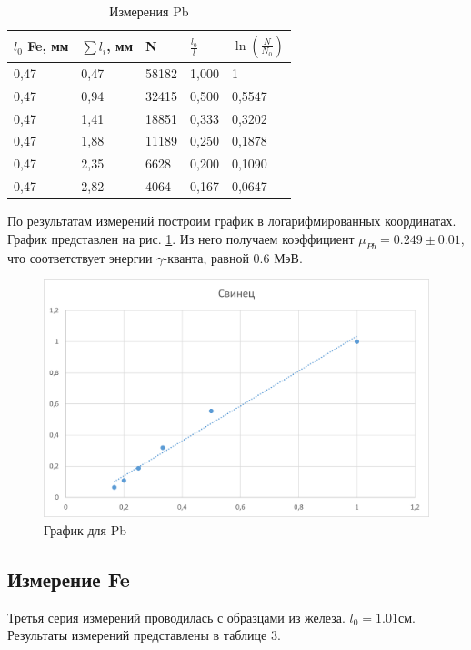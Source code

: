 \begin{table}[!ht]
    \centering
    \label{table:Pb}
    \caption{Измерения Pb}
    \begin{tabular}{|l|l|l|l|l|}
    \hline
        $l_0$ Fe, мм & $\sum l_i$, мм & N & $\frac {l_0}{l}$ & $\ln( \frac {N} {N_0} )$  \\ \hline
        0,47 & 0,47 & 58182 & 1,000 & 1  \\ \hline
        0,47 & 0,94 & 32415 & 0,500 & 0,5547  \\ \hline
        0,47 & 1,41 & 18851 & 0,333 & 0,3202  \\ \hline
        0,47 & 1,88 & 11189 & 0,250 & 0,1878  \\ \hline
        0,47 & 2,35 & 6628 & 0,200 & 0,1090  \\ \hline
        0,47 & 2,82 & 4064 & 0,167 & 0,0647  \\ \hline
    \end{tabular}
\end{table}

По результатам измерений построим график в логарифмированных координатах. График представлен на рис. \ref{fig:Pb_plot}. Из него получаем коэффициент $\mu_{Pb} = 0.249 \pm 0.01$, что соответствует энергии $\gamma$-кванта, равной 0.6 МэВ.

\begin{figure}[h]
    \centering
    \includegraphics[width=1\textwidth]{Pb_plot.png}
    \caption{График для Pb}
    \label{fig:Pb_plot}
\end{figure}

\subsection{Измерение Fe}
Третья серия измерений проводилась с образцами из железа. $l_0 = 1.01\text{см}$. Результаты измерений представлены в таблице 3.

